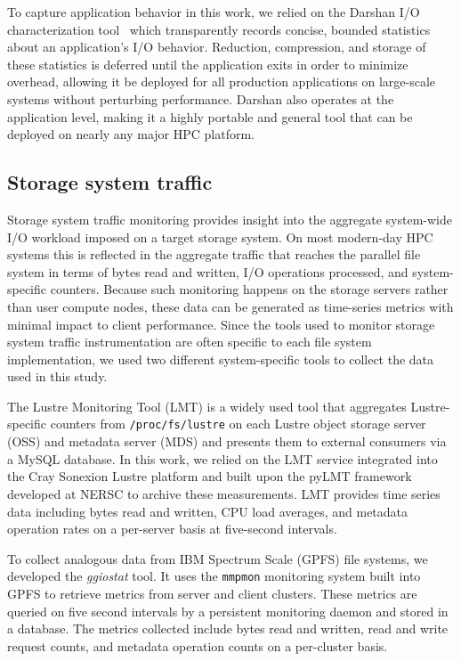 To capture application behavior in this work, we relied on the Darshan I/O characterization tool~\cite{carns200924} which transparently records concise, bounded statistics about an application's I/O behavior.
Reduction, compression, and storage of these statistics is deferred until the application exits in order to minimize overhead, allowing it be deployed for all production applications on large-scale systems without perturbing performance.
Darshan also operates at the application level, making it a highly portable and general tool that can be deployed on nearly any major HPC platform.

\subsection{Storage system traffic} \label{sec:methods/storagesystraffic}

Storage system traffic monitoring provides insight into the aggregate system-wide I/O workload imposed on a target storage system.
On most modern-day HPC systems this is reflected in the aggregate traffic that reaches the parallel file system in terms of bytes read and written, I/O operations processed, and system-specific counters.
Because such monitoring happens on the storage servers rather than user compute nodes, these data can be generated as time-series metrics with minimal impact to client performance.
Since the tools used to monitor storage system traffic instrumentation are often specific to each file system implementation, we used two different system-specific tools to collect the data used in this study.

\label{sec:methods/lmt}
The Lustre Monitoring Tool (LMT) is a widely used tool that aggregates Lustre-specific counters from \texttt{/proc/fs/lustre} on each Lustre object storage server (OSS) and metadata server (MDS) and presents them to external consumers via a MySQL database.
In this work, we relied on the LMT service integrated into the Cray Sonexion Lustre platform \cite{Keopp2014} and built upon the pyLMT framework developed at NERSC \cite{Uselton2009} to archive these measurements.
LMT provides time series data including bytes read and written, CPU load averages, and metadata operation rates on a per-server basis at five-second intervals.

\label{sec:methods/ggiostat}
To collect analogous data from IBM Spectrum Scale (GPFS) file systems, we developed the \emph{ggiostat} tool.
It uses the \texttt{mmpmon} monitoring system built into GPFS to retrieve metrics from server and client clusters.
These metrics are queried on five second intervals by a persistent monitoring daemon and stored in a database.
The metrics collected include bytes read and written, read and write request counts, and metadata operation counts on a per-cluster basis.

